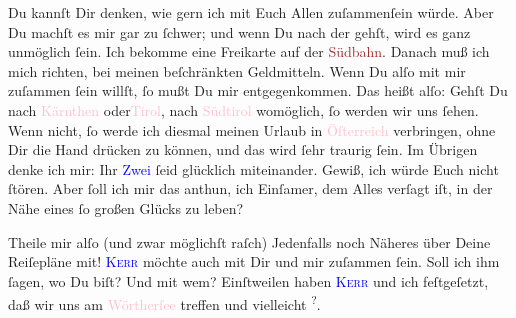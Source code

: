 \pstart
           Du kannſt Dir denken, wie gern ich mit Euch Allen zuſammenſein würde. Aber Du machſt
               es mir gar zu  ſchwer; und wenn Du nach der \label{K_L03071-1v}\label{K_L03071-1h} gehſt, wird es
               ganz unmöglich ſein. Ich bekomme eine Freikarte auf der \textcolor{brown}{Südbahn}{}\ledrightnote{\textcolor{brown}{Südbahn-Gesellschaft}}. Danach muß ich mich richten, bei meinen beſchränkten
               Geldmitteln. Wenn Du alſo mit mir {\pb}zuſammen ſein
               willſt, ſo mußt Du mir entgegenkommen. Das heißt alſo: Gehſt Du nach \introOben{}\textcolor{pink}{Kärnthen}{}\ledrightnote{\textcolor{pink}{Kärnten}} oder\introOben{}{ }\textcolor{pink}{Tirol}{}\ledrightnote{\textcolor{pink}{Tirol}}, nach \textcolor{pink}{Südtirol}{}\ledrightnote{\textcolor{pink}{Südtirol}} womöglich, ſo werden wir uns ſehen. Wenn  nicht, ſo werde ich diesmal meinen Urlaub in \textcolor{pink}{Öſterreich}{}\ledrightnote{\textcolor{pink}{Österreich}} verbringen, ohne Dir die Hand drücken zu können, und das wird
               ſehr traurig ſein. Im Übrigen denke ich mir: Ihr \textcolor{blue}{Zwei}{}\ledrightnote{{$\rightarrow$}\textcolor{blue}{Olga Schnitzler}} ſeid glücklich miteinander. Gewiß, ich würde Euch
               nicht ſtören. Aber ſoll ich mir das anthun, ich Einſamer, {\pb}dem Alles verſagt iſt, in der Nähe eines ſo großen
               Glücks zu leben?\pend
           
\pstart
           Theile mir alſo \introOben{}(und zwar möglichſt raſch)\introOben{}{ } Jedenfalls noch Näheres über Deine Reiſepläne mit! \textsc{\textcolor{blue}{Kerr}{}\ledrightnote{\textcolor{blue}{Alfred Kerr}}} möchte auch mit Dir und mir zuſammen ſein. Soll ich ihm ſagen, wo Du biſt? Und
               mit wem? Einſtweilen haben \textsc{\textcolor{blue}{Kerr}{}\ledrightnote{\textcolor{blue}{Alfred Kerr}}} und ich feſtgeſetzt, daß wir uns am \textcolor{pink}{Wörtherſee}{}\ledrightnote{\textcolor{pink}{Wörthersee}} treffen und vielleicht \label{K_L03071-7v}\label{K_L03071-7h}\substVorne{}\textsuperscript{?}\substDazwischen{}.\substHinten{}\pend
           
